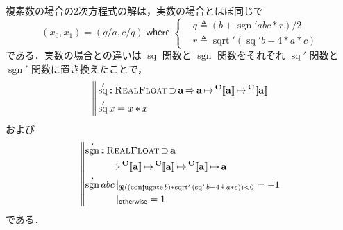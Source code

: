 \documentclass[a5paper,twoside,fleqn,draft]{jsbook}
\def\[{[\![}
\def\]{]\!]}
\DeclareMathOperator{\sgn}{sgn}
\newcommand{\mBrace}{\Vert}
\newcommand{\mKeyword}[1]{\mathsf{#1}}
\newcommand{\mOtherwiseKeyword}{\mKeyword{otherwise}}
\newcommand{\mWhereKeyword}{\mKeyword{where}}
\DeclareMathOperator{\mOtherwise}{\mOtherwiseKeyword}
\DeclareMathOperator{\mSuperClass}{\Rightarrow}
\DeclareMathOperator{\mSuperSet}{\supset}
\DeclareMathOperator{\mWhere}{\mWhereKeyword}
\newcommand{\mSpecialFunc}[1]{#1}
\DeclareMathOperator{\mConjugate}{\mSpecialFunc{conjugate}}
\DeclareMathOperator{\mRealPart}{\Re}
\DeclareMathOperator{\mSq}{\mSpecialFunc{sq}}
\DeclareMathOperator{\mSqrt}{\mSpecialFunc{sqrt}}
\DeclareMathOperator{\mComplexTimes}{\Dot\ast}
\DeclareMathOperator{\mFuncArrow}{\mapsto}
\DeclareMathOperator{\mIn}{{:\!:}}
\DeclareMathOperator{\mLetEq}{\triangleq}
\newcommand{\mType}[1]{\mathbf{#1}} %
\newcommand{\mA}{\mType{a}}
\newcommand{\mTypeAssemble}[2]{{}^\mType{#1}\[\mType{#2}\]}
\newcommand{\mComplexType}[1]{\mTypeAssemble{C}{#1}}
\newcommand{\mTypeClass}[1]{\textsc{#1}} %
\newcommand{\mRealFloatTypeClass}{\mTypeClass{RealFloat}}
\newcommand{\mGuard}[1]{\mathop{\mid_{#1}}}
\begin{document}
複素数の場合の2次方程式の解は，実数の場合とほぼ同じで
\begin{equation}
  (x_0,x_1)=(q/a,c/q)\mWhere\left\{
  \begin{aligned}
    &q\mLetEq\left(b+\sgn'abc*r\right)/2\\
    &r\mLetEq\mSqrt'{(\mSq'b-4*a*c)}
  \end{aligned}
  \right.
\end{equation}
である．実数の場合との違いは $\mSq$ 関数と $\sgn$ 関数をそれぞれ
$\mSq'$ 関数と $\sgn'$ 関数に置き換えたことで，
\begin{equation}
  \left\mBrace
  \begin{aligned}
    &\mSq'
    \mIn\mRealFloatTypeClass\mSuperSet\mA
    \mSuperClass\mA
    \mFuncArrow\mComplexType{a}
    \mFuncArrow\mComplexType{a}\\
    &\mSq'x
    =x*x
  \end{aligned}
  \right.
\end{equation}
および
\begin{equation}
  \left\mBrace
  \begin{aligned}
    &\begin{aligned}
       \sgn'
       &\mIn\mRealFloatTypeClass\mSuperSet\mA\\
       &\quad\mSuperClass\mComplexType{a}
       \mFuncArrow\mComplexType{a}
       \mFuncArrow\mComplexType{a}
       \mFuncArrow\mA
     \end{aligned}\\
    &\begin{aligned}
       \sgn'abc
       &\mGuard{\mRealPart((\mConjugate b)*\mSqrt'{(\mSq' b-4\mComplexTimes a*c)})<0}
       =-1\\
       &\mGuard{\mOtherwise}
       =1
     \end{aligned}
  \end{aligned}
  \right.
\end{equation}
である．
\end{document}

